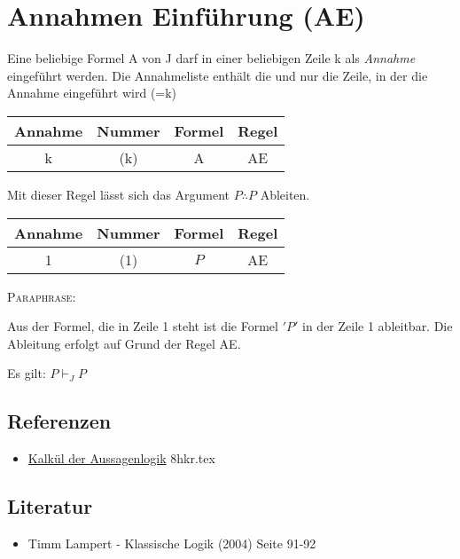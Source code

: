 \documentclass{sajzk}
\begin{document}
\section{Annahmen Einführung (AE)}
\label{yyix}

Eine beliebige Formel A von J darf in einer beliebigen Zeile k als
\textit{Annahme} eingeführt werden. Die Annahmeliste enthält die und nur die
Zeile, in der die Annahme eingeführt wird (=k)

\begin{center}
\begin{tabular}{|c|c|c|c|}
  \hline
  Annahme & Nummer & Formel & Regel \\
  \hline
  k     & (k)    & A      & AE \\
  \hline
\end{tabular}
\end{center}

Mit dieser Regel lässt sich das Argument $P \therefore P$ Ableiten.
\begin{center}
\begin{tabular}{|c|c|c|c|}
  \hline
  Annahme & Nummer & Formel & Regel \\
  \hline
  1     & (1)    & $P$      & AE \\
  \hline
\end{tabular}
\end{center}

\textsc{Paraphrase:}

Aus der Formel, die in Zeile 1 steht ist die Formel $'P'$ in der Zeile 1
ableitbar. Die Ableitung erfolgt auf Grund der Regel AE.

Es gilt: $P \vdash_J P$


\subsection{Referenzen}
\begin{itemize}
  \item \href{8hkr.pdf}{Kalkül der Aussagenlogik} 8hkr.tex
\end{itemize}

\subsection{Literatur}
\begin{itemize}
    \item Timm Lampert - Klassische Logik (2004) Seite 91-92
\end{itemize}
\end{document}
